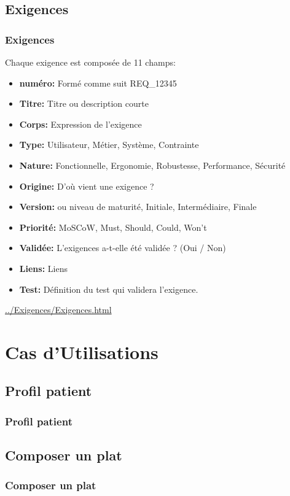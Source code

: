 \documentclass{beamer}
\begin{document}
\subsection{Exigences}
\begin{frame}
 \frametitle{Exigences}
Chaque exigence est composée de 11 champs:
\begin{itemize}
\item \textbf{numéro:} Formé comme suit REQ\_12345
\item \textbf{Titre:} Titre ou description courte
\item \textbf{Corps:} Expression de l'exigence
\item \textbf{Type:} Utilisateur, Métier, Système, Contrainte
\item \textbf{Nature:} Fonctionnelle, Ergonomie, Robustesse, Performance, Sécurité
\item \textbf{Origine:} D'où vient une exigence ?
\item \textbf{Version:} ou niveau de maturité, Initiale, Intermédiaire, Finale
\item \textbf{Priorité:} MoSCoW, Must, Should, Could, Won't
\item \textbf{Validée:} L'exigences a-t-elle été validée ? (Oui / Non)
\item \textbf{Liens:} Liens
\item \textbf{Test:} Définition du test qui validera l'exigence.
\end{itemize}

\url{../Exigences/Exigences.html}
\end{frame}

\section{Cas d'Utilisations}
\subsection{Profil patient}
\begin{frame}
\frametitle{Profil patient}

\end{frame}

\subsection{Composer un plat}
\begin{frame}
\frametitle{Composer un plat}

\end{frame}
\end{document}
